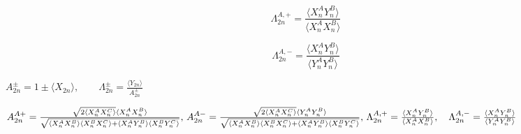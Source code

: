 \documentclass{article}
\begin{document}
\[ \Lambda^{A,+}_{2n} = \frac{\langle X^{A}_{n} Y^{B}_{n} \rangle}{\langle X^{A}_{n} X^{B}_{n} \rangle} \]
\pagebreak

\[ \Lambda^{A,-}_{2n} = \frac{\langle X^{A}_{n} Y^{B}_{n} \rangle}{\langle Y^{A}_{n} Y^{B}_{n} \rangle} \]
\pagebreak

$ A^{\pm}_{2n} = 1 \pm \langle X_{2n} \rangle, \qquad \Lambda ^{\pm}_{2n} = \frac{\langle Y_{2n} \rangle}{A^{\pm}_{2n}} $
\pagebreak

$ A^{A+}_{2n} = \frac{\sqrt{2 \langle X^{A}_{n} X^{C}_{n} \rangle}\langle X^{A}_{n} X^{B}_{n} \rangle} {\sqrt{\langle X^{A}_{n} X^{B}_{n} \rangle \langle X^{B}_{n} X^{C}_{n} \rangle + \langle X^{A}_{n} Y^{B}_{n} \rangle \langle X^{B}_{n} Y^{C}_{n} \rangle}}, \\ \, A^{A-}_{2n} = \frac{\sqrt{2 \langle X^{A}_{n} X^{C}_{n} \rangle}\langle Y^{A}_{n} Y^{B}_{n} \rangle} {\sqrt{\langle X^{A}_{n} X^{B}_{n} \rangle \langle X^{B}_{n} X^{C}_{n} \rangle + \langle X^{A}_{n} Y^{B}_{n} \rangle \langle X^{B}_{n} Y^{C}_{n} \rangle}}, \\ \, \Lambda^{A,+}_{2n} = \frac{\langle X^{A}_{n} Y^{B}_{n} \rangle}{\langle X^{A}_{n} X^{B}_{n} \rangle}, \quad \Lambda^{A,-}_{2n} = \frac{\langle X^{A}_{n} Y^{B}_{n} \rangle}{\langle Y^{A}_{n} Y^{B}_{n} \rangle} $
\pagebreak
\end{document}
